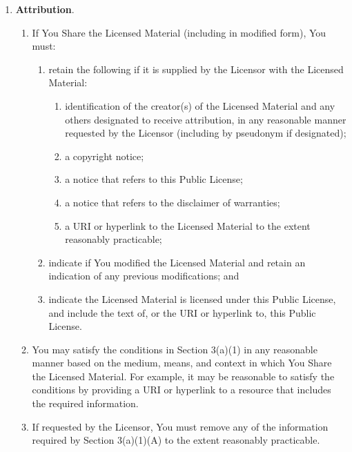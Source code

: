 \begin{enumerate}
\item \par \textbf{Attribution}.
\begin{enumerate}
\item \par If You Share the Licensed Material (including in modified form), You must:
\begin{enumerate}
\item retain the following if it is supplied by the Licensor with the Licensed Material:
\begin{enumerate}
\item identification of the creator(s) of the Licensed Material and any others designated to receive attribution, in any reasonable manner requested by the Licensor (including by pseudonym if designated);
\item a copyright notice;
\item a notice that refers to this Public License; 
\item a notice that refers to the disclaimer of warranties;
\item a URI or hyperlink to the Licensed Material to the extent reasonably practicable;
\end{enumerate}
\item indicate if You modified the Licensed Material and retain an indication of any previous modifications; and
\item indicate the Licensed Material is licensed under this Public License,
and include the text of, or the URI or hyperlink to, this Public
License.
\end{enumerate}

\item You may satisfy the conditions in Section 3(a)(1) in any reasonable manner based on the medium, means, and context in which You Share the Licensed Material. For example, it may be reasonable to satisfy the conditions by providing a URI or hyperlink to a resource that includes the required information.
\item If requested by the Licensor, You must remove any of the information required by Section 3(a)(1)(A) to the extent reasonably practicable.
\end{enumerate}


\end{enumerate}
